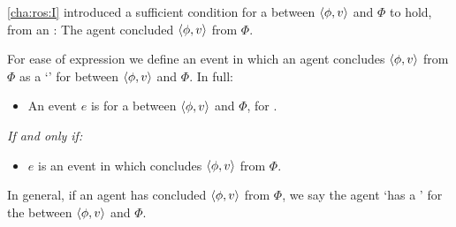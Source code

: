 \begin{note}
  \autoref{cha:ros:I} introduced a sufficient condition for a \ros{} between \(\langle \phi, v \rangle\) and \(\Phi\) to hold, from an \agpe{}:
  The agent concluded \(\langle \phi, v \rangle\) from \(\Phi\).

  For ease of expression we define an event in which an agent concludes \(\langle \phi, v \rangle\) from \(\Phi\) as a `' for \ros{} between \(\langle \phi, v \rangle\) and \(\Phi\).
  In full:

  \begin{definition}%
    \label{def:witnessing}%
    \vspace{-\baselineskip}
    \begin{itemize}
    \item
      An event \(e\) is \emph{} for a \ros{} between \(\langle \phi, v \rangle\) and \(\Phi\), for \vAgent{}.
    \end{itemize}

    \emph{If and only if:}

    \begin{itemize}
    \item
      \(e\) is an event in which \vAgent{} concludes \(\langle \phi, v \rangle\) from \(\Phi\).
    \end{itemize}
    \vspace{-\baselineskip}
  \end{definition}

  In general, if an agent has concluded \(\langle \phi, v \rangle\) from \(\Phi\), we say the agent `has a \wit{}' for the \ros{} between \(\langle \phi, v \rangle\) and \(\Phi\).
\end{note}

